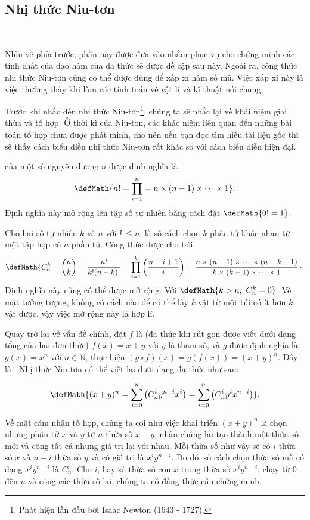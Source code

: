 \subsection{Nhị thức Niu-tơn}

\ %

Nhìn về phía trước, phần này được đưa vào nhằm phục vụ cho chứng minh các tính chất của đạo hàm của đa thức sẽ được đề cập sau này. Ngoài ra, công thức nhị thức Niu-tơn cũng có thể được dùng để xấp xỉ hàm số mũ. Việc xấp xỉ này là việc thường thấy khi làm các tính toán về vật lí và kĩ thuật nói chung.

Trước khi nhắc đến nhị thức Niu-tơn\footnote{Phát hiện lần đầu bởi Isaac Newton (1643 - 1727).}, chúng ta sẽ nhắc lại về khái niệm giai thừa và tổ hợp. Ở thời kì của Niu-tơn, các khác niệm liên quan đến những bài toán tổ hợp chưa được phát minh, cho nên nếu bạn đọc tìm hiểu tài liệu gốc thì sẽ thấy cách biểu diễn nhị thức Niu-tơn rất khác so với cách biểu diễn hiện đại.

 của một số nguyên dương $n$ được định nghĩa là
$$\defMath{n!= \prod_{i = 1}^{n} = n\times(n-1)\times \cdots \times 1}.$$
Định nghĩa này mở rộng lên tập số tự nhiên bằng cách đặt $\defMath{0!=1}$.

Cho hai số tự nhiên $k$ và $n$ với $k \leq n$.  là số cách chọn $k$ phần tử khác nhau từ một tập hợp có $n$ phần tử. Công thức được cho bởi
$$\defMath{C_n^k = \binom{n}{k} = \frac{n!}{k!(n - k)!} = \prod_{i=1}^{k}\left(\frac{n - i + 1}{i}\right) = \frac{n\times(n-1)\times \cdots \times (n-k+1)}{k\times (k-1)\times \cdots \times 1}}.$$
Định nghĩa này cũng có thể được mở rộng. Với $\defMath{k > n,~C_n^k = 0}$. Về mặt tưởng tượng, không có cách nào để có thể lấy $k$ vật từ một túi có ít hơn $k$ vật được, vậy việc mở rộng này là hợp lí.

Quay trở lại về vấn đề chính, đặt $f$ là  (đa thức khi rút gọn được viết dưới dạng tổng của hai đơn thức) $f(x) = x + y$ với $y$ là tham số, và $g$ được định nghĩa là $g(x) = x^n$ với $n \in \mathbb{N}$, thực hiện $\left(g \circ f\right)(x) = g(f(x)) = (x + y)^n$. Đây là . Nhị thức Niu-tơn có thể viết lại dưới dạng đa thức như sau:

$$\defMath{(x + y)^n = \sum_{i = 0}^{n} \left(C_n^i y^{n-i} x^i \right) = \sum_{i = 0}^{n}\left( C_n^i y^i x^{n-i} \right)}.$$

Về mặt cảm nhận tổ hợp, chúng ta coi như việc khai triển $(x + y)^n$ là chọn những phần tử $x$ và $y$ từ $n$ thừa số $x + y$, nhân chúng lại tạo thành một thừa số mới và cộng tất cả những giá trị lại với nhau. Mỗi thừa số như vậy sẽ có $i$ thừa số $x$ và $n-i$ thừa số $y$ và có giá trị là $x^iy^{n-i}$. Do đó, số cách chọn thừa số mà có dạng $x^iy^{n-i}$ là $C_n^i$. Cho $i$, hay số thừa số con $x$ trong thừa số $x^iy^{n-i}$, chạy từ $0$ đến $n$ và cộng các thừa số lại, chúng ta có đẳng thức cần chứng minh.

